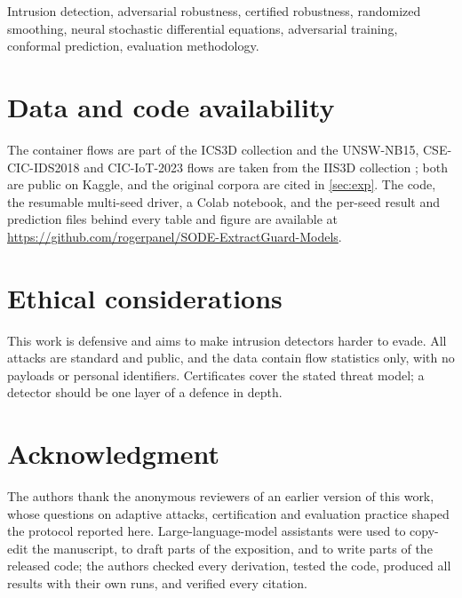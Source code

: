 \documentclass[journal]{IEEEtran}
\newcommand{\coderepo}{\url{https://github.com/rogerpanel/SODE-ExtractGuard-Models}}
\theoremstyle{definition}
\begin{document}
\begin{IEEEkeywords}
Intrusion detection, adversarial robustness, certified robustness, randomized
smoothing, neural stochastic differential equations, adversarial training,
conformal prediction, evaluation methodology.
\end{IEEEkeywords}

\IEEEpeerreviewmaketitle



\section*{Data and code availability}
The container flows are part of the ICS3D collection \citep{anaedevha2025ics3d}
and the UNSW-NB15, CSE-CIC-IDS2018 and CIC-IoT-2023 flows are taken from the IIS3D collection
\citep{anaedevha2025iis3d}; both are public on Kaggle, and the original corpora are
cited in \cref{sec:exp}. The code, the resumable multi-seed driver, a Colab
notebook, and the per-seed result and prediction files behind every table and
figure are available at \coderepo.

\section*{Ethical considerations}
This work is defensive and aims to make intrusion detectors harder to evade. All
attacks are standard and public, and the data contain flow statistics only, with
no payloads or personal identifiers. Certificates cover the stated threat model;
a detector should be one layer of a defence in depth.

\section*{Acknowledgment}
The authors thank the anonymous reviewers of an earlier version of this work,
whose questions on adaptive attacks, certification and evaluation practice
shaped the protocol reported here.
Large-language-model assistants were used to copy-edit the manuscript, to draft
parts of the exposition, and to write parts of the released code; the authors
checked every derivation, tested the code, produced all results with their own
runs, and verified every citation.





\end{document}
